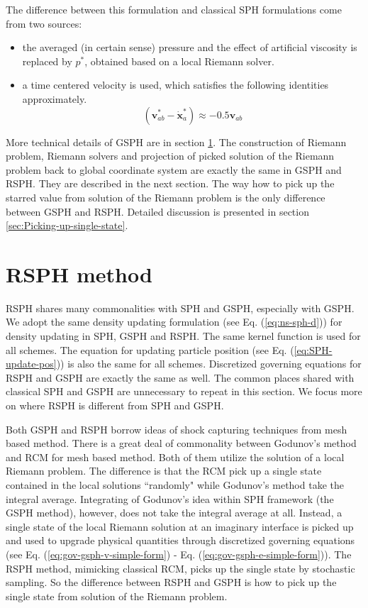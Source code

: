 The difference between this formulation and classical SPH formulations come from two sources: 
\begin{itemize}
\item the averaged (in certain sense) pressure and the effect of artificial viscosity is replaced by  $p^{\ast}$, obtained based on a local Riemann solver.
\item a time centered velocity is used, which satisfies the following identities approximately. 
\begin{equation}
\left( \textbf{v}_{a b}^{\ast} - \dot{\textbf{x}}_{a}^{\ast} \right) \approx -0.5 \textbf{v}_{a b}
\label{eq:SPH-GSPH-difference2}
\end{equation}
\end{itemize}

More technical details of GSPH are in section \ref{sec:RSPH-method}. The construction of Riemann problem, Riemann solvers and projection of picked solution of the Riemann problem back to global coordinate system are exactly the same in GSPH and RSPH. They are described in the next section. The way how to pick up the starred value from solution of the Riemann problem is the only difference between GSPH and RSPH. Detailed discussion is presented in section \ref{sec:Picking-up-single-state}. 

\section{RSPH method} \label{sec:RSPH-method}
RSPH shares many commonalities with SPH and GSPH, especially with GSPH. We adopt the same density updating formulation (see Eq. (\ref{eq:ns-sph-d})) for density updating in SPH, GSPH and RSPH. The same kernel function is used for all schemes. The equation for updating particle position (see Eq. (\ref{eq:SPH-update-pos})) is also the same for all schemes. Discretized governing equations for RSPH and GSPH are exactly the same as well. The common places shared with classical SPH and GSPH are unnecessary to repeat in this section. We focus more on where RSPH is different from SPH and GSPH.

Both GSPH and RSPH borrow ideas of shock capturing techniques from mesh based method. There is a great deal of commonality between Godunov's method and RCM for mesh based method. Both of them utilize the solution of a local Riemann problem. The difference is that the RCM pick up a single state contained in the local solutions ``randomly" while Godunov's method take the integral average. 
Integrating of Godunov's idea within SPH framework (the GSPH method), however, does not take the integral average at all. Instead, a single state of the local Riemann solution at an imaginary interface is picked up and used to upgrade physical quantities through discretized governing equations (see Eq. (\ref{eq:gov-gsph-v-simple-form}) - Eq. (\ref{eq:gov-gsph-e-simple-form})). The RSPH method, mimicking classical RCM, picks up the single state by stochastic sampling. So the difference between RSPH and GSPH is how to pick up the single state from solution of the Riemann problem.

